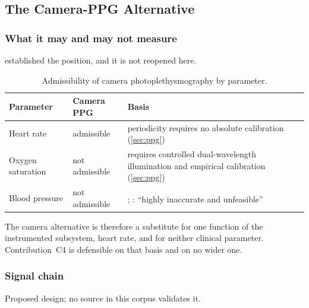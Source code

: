 \documentclass[12pt,a4paper,oneside]{report}
\newcommand{\bq}[1]{``#1''\textsuperscript{\dag}}
\begin{document}
\subsection{The Camera-PPG Alternative}\label{sec:camera-ppg}

\subsubsection{What it may and may not measure}

 established the position, and it is not reopened here.

\begin{table}[htbp]
\centering\small
\caption{Admissibility of camera photoplethysmography by parameter.}\label{tab:camera-admissibility}
\begin{tabularx}{\textwidth}{@{}>{\raggedright\arraybackslash}p{3.4cm} >{\raggedright\arraybackslash}p{2.6cm} X@{}}
\toprule
\textbf{Parameter} & \textbf{Camera PPG} & \textbf{Basis} \\
\midrule
Heart rate & admissible & periodicity requires no absolute calibration (\cref{sec:ppg}) \\
Oxygen saturation & not admissible & requires controlled dual-wavelength illumination and empirical calibration (\cref{sec:ppg}) \\
Blood pressure & not admissible & \textcite{who2023hypertension}; \textcite{alessa2019}: \bq{highly inaccurate and unfeasible} \\
\bottomrule
\end{tabularx}
\end{table}

The camera alternative is therefore a substitute for one function of the instrumented subsystem, heart rate, and for neither clinical parameter. Contribution~C4 is defensible on that basis and on no wider one.

\subsubsection{Signal chain}\label{sec:ppg-chain}

Proposed design; no source in this corpus validates it.
\end{document}
